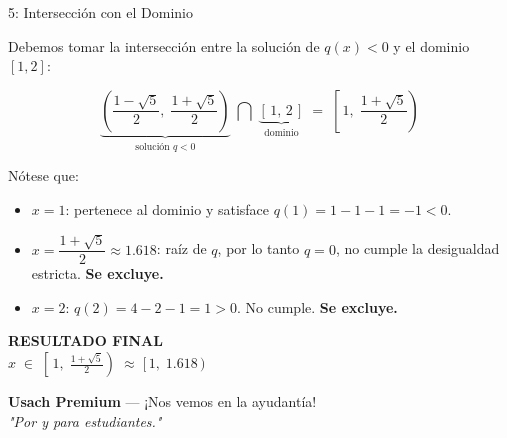 \documentclass[letterpaper, 12pt]{article}
\begin{document}
\bigskip

\begin{paso}{5: Intersección con el Dominio}

Debemos tomar la intersección entre la solución de $q(x) < 0$ y el dominio $[1,2]$:

\[
    \underbrace{\left(\frac{1-\sqrt{5}}{2},\;\frac{1+\sqrt{5}}{2}\right)}_{\text{solución } q<0}
    \;\bigcap\;
    \underbrace{[\,1,\,2\,]}_{\text{dominio}}
    \;=\;
    \left[\,1,\;\frac{1+\sqrt{5}}{2}\right)
\]

\medskip
Nótese que:
\begin{itemize}[leftmargin=1.5cm]
    \item $x = 1$: pertenece al dominio y satisface $q(1) = 1-1-1 = -1 < 0$. \checkmark
    \item $x = \dfrac{1+\sqrt{5}}{2} \approx 1.618$: raíz de $q$, por lo tanto $q = 0$,
          no cumple la desigualdad estricta. \textbf{Se excluye.}
    \item $x = 2$: $q(2) = 4-2-1 = 1 > 0$. No cumple. \textbf{Se excluye.}
\end{itemize}

\end{paso}

\bigskip

\begin{tcolorbox}[colback=azulFuerte, colframe=azulFuerte,
    colupper=white, arc=10pt, boxrule=1.5pt, enhanced,
    drop shadow={black!15}]
    \centering
    \large\textbf{RESULTADO FINAL}\\[0.5em]
    \LARGE
    $\displaystyle
        x \;\in\; \left[\,1,\;\frac{1+\sqrt{5}}{2}\right)
        \;\approx\; [\,1,\;1.618\,)$
\end{tcolorbox}

\vspace{1cm}
\begin{center}
    \small\textbf{Usach Premium} — ¡Nos vemos en la ayudantía! \\
    \textit{"Por y para estudiantes."}
\end{center}
\end{document}
